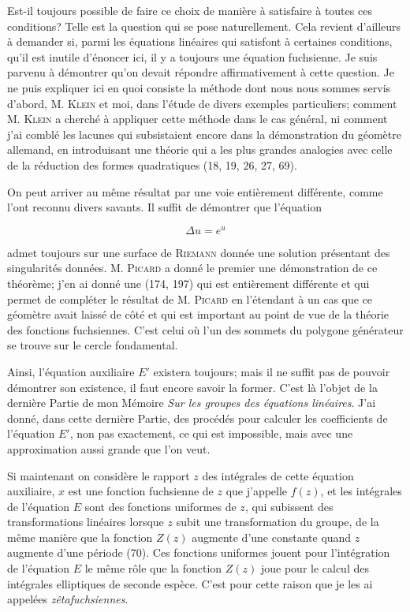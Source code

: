 \documentclass[11pt]{article}
\begin{document}
Est-il toujours possible de faire ce choix de manière à satisfaire à toutes ces conditions? Telle est la question qui se pose naturellement. Cela revient d’ailleurs à demander si, parmi les équations linéaires qui satisfont à certaines conditions, qu’il est inutile d’énoncer ici, il y a toujours une équation fuchsienne. Je suis parvenu à démontrer qu’on devait répondre affirmativement à cette question. Je ne puis expliquer ici en quoi consiste la méthode dont nous nous sommes servis d’abord, M. \textsc{Klein} et moi, dans l’étude de divers exemples particuliers; comment M. \textsc{Klein} a cherché à appliquer cette méthode dans le cas général, ni comment j’ai comblé les lacunes qui subsistaient encore dans la démonstration du géomètre allemand, en introduisant une théorie qui a les plus grandes analogies avec celle de la réduction des formes quadratiques (18, 19, 26, 27, 69).

On peut arriver au même résultat par une voie entièrement différente, comme l’ont reconnu divers savants. Il suffit de démontrer que l’équation

\[
 \Delta u=e^u
\]

admet toujours sur une surface de \textsc{Riemann} donnée une solution présentant des singularités données. M. \textsc{Picard} a donné le premier une démonstration de ce théorème; j’en ai donné une (174, 197) qui est entièrement différente et qui permet de compléter le résultat de M. \textsc{Picard} en l’étendant à un cas que ce géomètre avait laissé de côté et qui est important au point de vue de la théorie des fonctions fuchsiennes. C’est celui où l’un des sommets du polygone générateur se trouve sur le cercle fondamental.

Ainsi, l’équation auxiliaire $E'$ existera toujours; mais il ne suffit pas de pouvoir démontrer son existence, il faut encore savoir la former. C’est là l’objet de la dernière Partie de mon Mémoire \emph{Sur les groupes des équations linéaires}. J’ai donné, dans cette dernière Partie, des procédés pour calculer les coefficients de l’équation $E'$, non pas exactement, ce qui est impossible, mais avec une approximation aussi grande que l’on veut.

Si maintenant on considère le rapport $z$ des intégrales de cette équation auxiliaire, $x$ est une fonction fuchsienne de $z$ que j’appelle $f(z)$, et les intégrales de l’équation $E$ sont des fonctions uniformes de $z$, qui subissent des transformations linéaires lorsque $z$ subit une transformation du groupe, de la même manière que la fonction $Z(z)$ augmente d’une constante quand $z$ augmente d’une période (70). Ces fonctions uniformes jouent pour l’intégration de l’équation $E$ le même rôle que la fonction $Z(z)$ joue pour le calcul des intégrales elliptiques de seconde espèce. C’est pour cette raison que je les ai appelées \emph{zêtafuchsiennes}.
\end{document}
